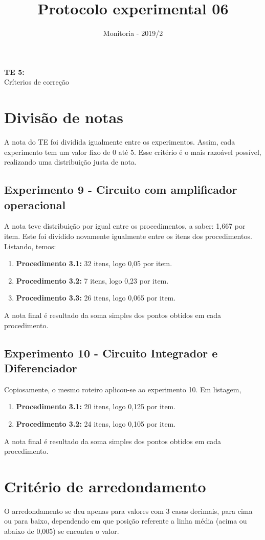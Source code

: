 \documentclass[10pt]{article}
\author{Monitoria - 2019/2}
\title{Protocolo experimental 06}
\begin{document}
\begin{center}
\vspace*{.2cm}
\Large\textbf{TE 5:}\\ %
\Large{Críterios de correção}
\end{center}
\justify

\section{Divisão de notas}
A nota do TE foi dividida igualmente entre os experimentos. Assim, cada experimento tem um valor fixo de 0 até 5. Esse critério é o mais razoável possível, realizando uma distribuição justa de nota.
\subsection{Experimento 9 - Circuito com amplificador operacional}
A nota teve distribuição por igual entre os procedimentos, a saber: 1,667 por item. Este foi dividido novamente igualmente entre os itens dos procedimentos. Listando, temos:
\begin{enumerate}
	\item \textbf{Procedimento 3.1:} 32 itens, logo 0,05 por item.
	\item \textbf{Procedimento 3.2:} 7 itens, logo 0,23 por item.
	\item \textbf{Procedimento 3.3:} 26 itens, logo 0,065 por item.
\end{enumerate}

A nota final é resultado da soma simples dos pontos obtidos em cada procedimento.

\subsection{Experimento 10 - Circuito Integrador e Diferenciador}
Copiosamente, o mesmo roteiro aplicou-se ao experimento 10. Em listagem,

\begin{enumerate}
	\item \textbf{Procedimento 3.1:} 20 itens, logo 0,125 por item.
	\item \textbf{Procedimento 3.2:} 24 itens, logo 0,105 por item.
\end{enumerate}

A nota final é resultado da soma simples dos pontos obtidos em cada procedimento.

\section{Critério de arredondamento}
O arredondamento se deu apenas para valores com 3 casas decimais, para cima ou para baixo, dependendo em que posição referente a linha média (acima ou abaixo de 0,005) se encontra o valor.
\end{document}
